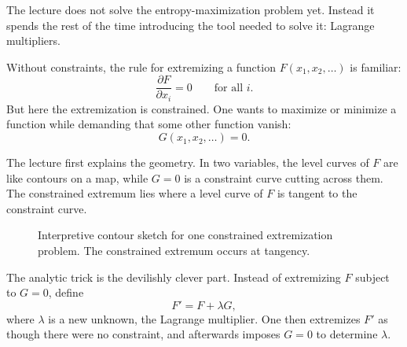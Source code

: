 The lecture does not solve the entropy-maximization problem yet. Instead it spends the rest of the time introducing the tool needed to solve it: Lagrange multipliers.

Without constraints, the rule for extremizing a function \(F(x_1,x_2,\dots)\) is familiar:
\begin{equation}
\frac{\partial F}{\partial x_i}=0
\qquad
\text{for all } i.
\end{equation}
But here the extremization is constrained. One wants to maximize or minimize a function while demanding that some other function vanish:
\begin{equation}
G(x_1,x_2,\dots)=0.
\end{equation}

The lecture first explains the geometry. In two variables, the level curves of \(F\) are like contours on a map, while \(G=0\) is a constraint curve cutting across them. The constrained extremum lies where a level curve of \(F\) is tangent to the constraint curve.

\begin{figure}[htbp]
\centering
{}
\caption{Interpretive contour sketch for one constrained extremization problem. The constrained extremum occurs at tangency.}
\end{figure}

The analytic trick is the devilishly clever part. Instead of extremizing \(F\) subject to \(G=0\), define
\begin{equation}
F' = F+\lambda G,
\end{equation}
where \(\lambda\) is a new unknown, the Lagrange multiplier. One then extremizes \(F'\) as though there were no constraint, and afterwards imposes \(G=0\) to determine \(\lambda\).

